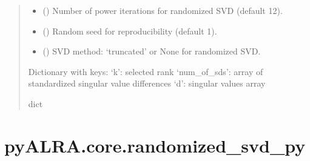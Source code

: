 \documentclass[letterpaper,10pt,english]{sphinxmanual}
\begin{document}
\begin{fulllineitems}
\begin{quote}
\begin{description}
\begin{itemize}
\item {} 
\sphinxAtStartPar
{} (\sphinxstyleliteralemphasis{\sphinxupquote{, }}) \textendash{} Number of power iterations for randomized SVD (default 12).

\item {} 
\sphinxAtStartPar
{} (\sphinxstyleliteralemphasis{\sphinxupquote{, }}) \textendash{} Random seed for reproducibility (default 1).

\item {} 
\sphinxAtStartPar
{} (\sphinxstyleliteralemphasis{\sphinxupquote{, }}) \textendash{} SVD method: ‘truncated’ or None for randomized SVD.

\end{itemize}

\sphinxAtStartPar
Dictionary with keys:
\sphinxhyphen{} ‘k’: selected rank
\sphinxhyphen{} ‘num\_of\_sds’: array of standardized singular value differences
\sphinxhyphen{} ‘d’: singular values array

\sphinxAtStartPar
dict

\end{description}\end{quote}

\end{fulllineitems}



\section{pyALRA.core.randomized\_svd\_py}
\label{\detokenize{core:pyalra-core-randomized-svd-py}}
\end{document}

